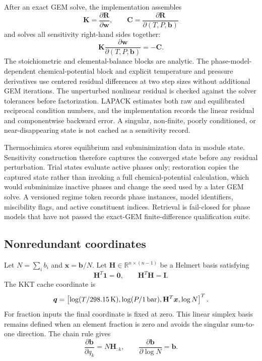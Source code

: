 \documentclass[11pt]{article}
\newcommand{\R}{\mathbb{R}}
\begin{document}
After an exact GEM solve, the implementation assembles
\begin{equation}
  \mathbf{K}=\frac{\partial\boldsymbol{R}}{\partial\boldsymbol{w}},
  \qquad
  \mathbf{C}=\frac{\partial\boldsymbol{R}}{\partial(T,P,\boldsymbol{b})}
\end{equation}
and solves all sensitivity right-hand sides together:
\begin{equation}
  \mathbf{K}\frac{\partial\boldsymbol{w}}
  {\partial(T,P,\boldsymbol{b})}=-\mathbf{C}.
  \label{eq:kkt-sensitivity}
\end{equation}
The stoichiometric and elemental-balance blocks are analytic.  The phase-model-dependent
chemical-potential block and explicit temperature and pressure derivatives use centered residual
differences at two step sizes without additional GEM iterations.  The unperturbed nonlinear
residual is checked against the solver tolerances before factorization.  LAPACK estimates both raw
and equilibrated reciprocal condition numbers, and the implementation records the linear residual
and componentwise backward error.  A singular, non-finite, poorly conditioned, or
near-disappearing state is not cached as a sensitivity record.

Thermochimica stores equilibrium and subminimization data in module state.  Sensitivity
construction therefore captures the converged state before any residual perturbation.  Trial
states evaluate active phases only; restoration copies the captured state rather than invoking a
full chemical-potential calculation, which would subminimize inactive phases and change the seed
used by a later GEM solve.  A versioned regime token records phase instances, model identifiers,
miscibility flags, and active constituent indices.  Retrieval is fail-closed for phase models that
have not passed the exact-GEM finite-difference qualification suite.

\subsection{Nonredundant coordinates}

Let $N=\sum_i b_i$ and $\boldsymbol{x}=\boldsymbol{b}/N$.  Let
$\mathbf{H}\in\R^{n\times(n-1)}$ be a Helmert basis satisfying
\begin{equation}
  \mathbf{H}^T\boldsymbol{1}=\boldsymbol{0},\qquad
  \mathbf{H}^T\mathbf{H}=\mathbf{I}.
\end{equation}
The KKT cache coordinate is
\begin{equation}
  \boldsymbol{q}=\left[
    \log(T/298.15\,{\rm K}),\log(P/1\,{\rm bar}),
    \mathbf{H}^T\boldsymbol{x},\log N
  \right]^T.
  \label{eq:kkt-coordinate}
\end{equation}
For fraction inputs the final coordinate is fixed at zero.  This linear simplex basis remains
defined when an element fraction is zero and avoids the singular sum-to-one direction.  The chain
rule gives
\begin{equation}
  \frac{\partial\boldsymbol{b}}{\partial q_k}=N\mathbf{H}_{:k},
  \qquad
  \frac{\partial\boldsymbol{b}}{\partial\log N}=\boldsymbol{b}.
\end{equation}
\end{document}
